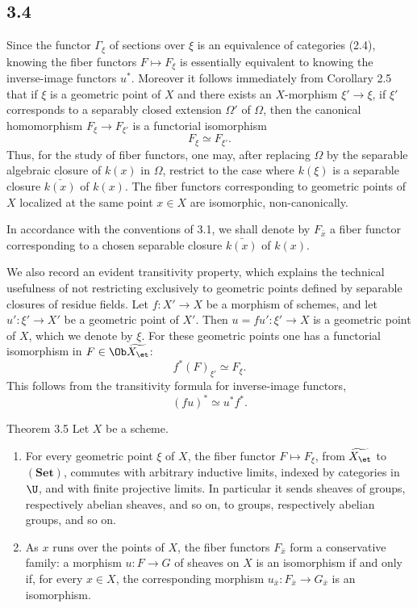 \subsection*{3.4}
Since the functor \(\Gamma_\xi\) of sections over \(\xi\) is an equivalence of categories (2.4), knowing the fiber functors \(F\mapsto F_\xi\) is essentially equivalent to knowing the inverse-image functors \(u^*\). Moreover it follows immediately from Corollary 2.5 that if \(\xi\) is a geometric point of \(X\) and there exists an \(X\)-morphism \(\xi'\to\xi\), \ie if \(\xi'\) corresponds to a separably closed extension \(\Omega'\) of \(\Omega\), then the canonical homomorphism \(F_\xi\to F_{\xi'}\) is a functorial isomorphism
\[
F_\xi\simeq F_{\xi'}.
\]
Thus, for the study of fiber functors, one may, after replacing \(\Omega\) by the separable algebraic closure of \(k(x)\) in \(\Omega\), restrict to the case where \(k(\xi)\) is a separable closure \(\bar{k(x)}\) of \(k(x)\). The fiber functors corresponding to geometric points of \(X\) localized at the same point \(x\in X\) are isomorphic, non-canonically.

In accordance with the conventions of 3.1, we shall denote by \(F_{\bar x}\) a fiber functor corresponding to a chosen separable closure \(\bar{k(x)}\) of \(k(x)\).

We also record an evident transitivity property, which explains the technical usefulness of not restricting exclusively to geometric points defined by separable closures of residue fields. Let \(f:X'\to X\) be a morphism of schemes, and let \(u':\xi'\to X'\) be a geometric point of \(X'\). Then \(u=fu':\xi'\to X\) is a geometric point of \(X\), which we denote by \(\xi\). For these geometric points one has a functorial isomorphism in \(F\in\Ob\widetilde{X_{\et}}\):
\[
f^*(F)_{\xi'}\simeq F_\xi.
\]
This follows from the transitivity formula for inverse-image functors,
\[
(fu)^*\simeq u^*f^*.
\]

\begin{statement}{Theorem 3.5}
Let \(X\) be a scheme.
\begin{enumerate}[label=\alph*)]
\item For every geometric point \(\xi\) of \(X\), the fiber functor \(F\mapsto F_\xi\), from \(\widetilde{X_{\et}}\) to \((\mathbf{Set})\), commutes with arbitrary inductive limits, indexed by categories in \(\U\), and with finite projective limits. In particular it sends sheaves of groups, respectively abelian sheaves, and so on, to groups, respectively abelian groups, and so on.
\item As \(x\) runs over the points of \(X\), the fiber functors \(F_{\bar x}\) form a conservative family: a morphism \(u:F\to G\) of sheaves on \(X\) is an isomorphism if and only if, for every \(x\in X\), the corresponding morphism \(u_{\bar x}:F_{\bar x}\to G_{\bar x}\) is an isomorphism.
\end{enumerate}
\end{statement}

